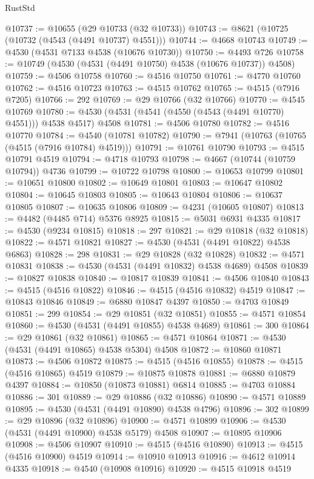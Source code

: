 \begin{lexlean}{RustStd}
\begin{coremodule}
@10737 := @10655 (@29 @10733 (@32 @10733))
@10743 := @8621 (@10725 (@10732 (@4543 (@4491 @10737) @4551)))
@10744 := @4668 @10743
@10749 := @4530 (@4531 @7133 @4538 (@10676 @10730))
@10750 := @4493 @726
@10758 := @10749 (@4530 (@4531 (@4491 @10750) @4538 (@10676 @10737)) @4508)
@10759 := @4506 @10758
@10760 := @4516 @10750
@10761 := @4770 @10760
@10762 := @4516 @10723
@10763 := @4515 @10762
@10765 := @4515 (@7916 @7205)
@10766 := 292
@10769 := @29 @10766 (@32 @10766)
@10770 := @4545 @10769
@10780 := @4530 (@4531 (@4541 (@4550 (@4543 (@4491 @10770) @4551))) @4538 @4517) @4508
@10781 := @4506 @10780
@10782 := @4516 @10770
@10784 := @4540 (@10781 @10782)
@10790 := @7941 (@10763 (@10765 (@4515 (@7916 @10784) @4519)))
@10791 := @10761 @10790
@10793 := @4515 @10791 @4519
@10794 := @4718 @10793
@10798 := @4667 (@10744 (@10759 @10794)) @4736
@10799 := @10722 @10798
@10800 := @10653 @10799
@10801 := @10651 @10800
@10802 := @10649 @10801
@10803 := @10647 @10802
@10804 := @10645 @10803
@10805 := @10643 @10804
@10806 := @10637 @10805
@10807 := @10635 @10806
@10809 := @4231 (@10605 @10807)
@10813 := @4482 (@4485 @714) @5376 @8925
@10815 := @5031 @6931 @4335
@10817 := @4530 (@9234 @10815)
@10818 := 297
@10821 := @29 @10818 (@32 @10818)
@10822 := @4571 @10821
@10827 := @4530 (@4531 (@4491 @10822) @4538 @6863)
@10828 := 298
@10831 := @29 @10828 (@32 @10828)
@10832 := @4571 @10831
@10838 := @4530 (@4531 (@4491 @10832) @4538 @4689) @4508
@10839 := @10827 @10838
@10840 := @10817 @10839
@10841 := @4506 @10840
@10843 := @4515 (@4516 @10822)
@10846 := @4515 (@4516 @10832) @4519
@10847 := @10843 @10846
@10849 := @6880 @10847 @4397
@10850 := @4703 @10849
@10851 := 299
@10854 := @29 @10851 (@32 @10851)
@10855 := @4571 @10854
@10860 := @4530 (@4531 (@4491 @10855) @4538 @4689)
@10861 := 300
@10864 := @29 @10861 (@32 @10861)
@10865 := @4571 @10864
@10871 := @4530 (@4531 (@4491 @10865) @4538 @5304) @4508
@10872 := @10860 @10871
@10873 := @4506 @10872
@10875 := @4515 (@4516 @10855)
@10878 := @4515 (@4516 @10865) @4519
@10879 := @10875 @10878
@10881 := @6880 @10879 @4397
@10884 := @10850 (@10873 @10881) @6814
@10885 := @4703 @10884
@10886 := 301
@10889 := @29 @10886 (@32 @10886)
@10890 := @4571 @10889
@10895 := @4530 (@4531 (@4491 @10890) @4538 @4796)
@10896 := 302
@10899 := @29 @10896 (@32 @10896)
@10900 := @4571 @10899
@10906 := @4530 (@4531 (@4491 @10900) @4538 @5179) @4508
@10907 := @10895 @10906
@10908 := @4506 @10907
@10910 := @4515 (@4516 @10890)
@10913 := @4515 (@4516 @10900) @4519
@10914 := @10910 @10913
@10916 := @4612 @10914 @4335
@10918 := @4540 (@10908 @10916)
@10920 := @4515 @10918 @4519

\end{coremodule}
\end{lexlean}

